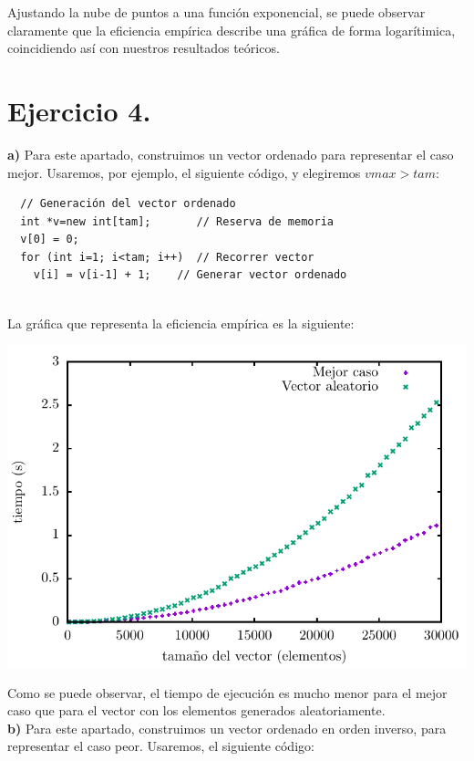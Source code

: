 \documentclass[11pt,a4paper]{article}
\begin{document}
Ajustando la nube de puntos a una función exponencial, se puede observar claramente que la eficiencia empírica describe una gráfica de forma logarítimica, coincidiendo así con nuestros resultados teóricos.

\section*{Ejercicio 4.}

\textbf{a)} Para este apartado, construimos un vector ordenado para representar el caso mejor. Usaremos, por ejemplo, el siguiente código, y elegiremos $vmax > tam$:

\begin{lstlisting}
  // Generación del vector ordenado
  int *v=new int[tam];       // Reserva de memoria
  v[0] = 0;
  for (int i=1; i<tam; i++)  // Recorrer vector
    v[i] = v[i-1] + 1;    // Generar vector ordenado
\end{lstlisting}
\hfill \\
La gráfica que representa la eficiencia empírica es la siguiente:

\begin{center}
	\includegraphics{img/tiempos_burbuja_mejor_caso.pdf}
\end{center}

Como se puede observar, el tiempo de ejecución es mucho menor para el mejor caso que para el vector con los elementos generados aleatoriamente.\\

\textbf{b)} Para este apartado, construimos un vector ordenado en orden inverso, para representar el caso peor. Usaremos, el siguiente código:
\end{document}

